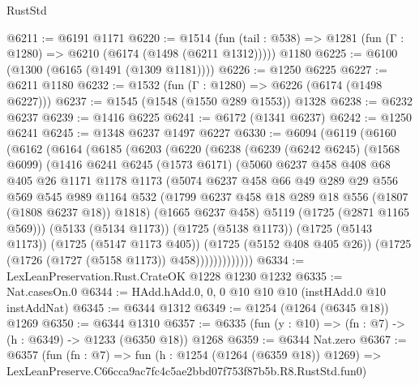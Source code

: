 \begin{lexlean}{RustStd}
\begin{coremodule}
@6211 := @6191 @1171
@6220 := @1514
    (fun (tail : @538) => @1281 (fun (Γ : @1280) => @6210 (@6174 (@1498 (@6211 @1312)))))
    @1180
@6225 := @6100 (@1300 (@6165 (@1491 (@1309 @1181))))
@6226 := @1250 @6225
@6227 := @6211 @1180
@6232 := @1532 (fun (Γ : @1280) => @6226 (@6174 (@1498 @6227)))
@6237 := @1545 (@1548 (@1550 @289 @1553)) @1328
@6238 := @6232 @6237
@6239 := @1416 @6225
@6241 := @6172 (@1341 @6237)
@6242 := @1250 @6241
@6245 := @1348 @6237 @1497 @6227
@6330 := @6094
    (@6119
      (@6160
        (@6162
          (@6164
            (@6185
              (@6203
                (@6220
                  (@6238
                    (@6239
                      (@6242 @6245)
                      (@1568 @6099)
                      (@1416
                        @6241
                        @6245
                        (@1573 @6171)
                        (@5060
                          @6237
                          @458
                          @408
                          @68
                          @405
                          @26
                          @1171
                          @1178
                          @1173
                          (@5074
                            @6237
                            @458
                            @66
                            @49
                            @289
                            @29
                            @556
                            @569
                            @545
                            @989
                            @1164
                            @532
                            (@1799 @6237 @458 @18 @289 @18 @556 (@1807 (@1808 @6237 @18)) @1818)
                            (@1665 @6237 @458)
                            @5119
                            (@1725 (@2871 @1165 @569)))
                          (@5133 (@5134 @1173))
                          (@1725 (@5138 @1173))
                          (@1725 (@5143 @1173))
                          (@1725 (@5147 @1173 @405))
                          (@1725 (@5152 @408 @405 @26))
                          (@1725 (@1726 (@1727 (@5158 @1173)) @458)))))))))))))
@6334 := LexLeanPreservation.Rust.CrateOK @1228 @1230 @1232
@6335 := Nat.casesOn.{0}
@6344 := HAdd.hAdd.{0, 0, 0} @10 @10 @10 (instHAdd.{0} @10 instAddNat)
@6345 := @6344 @1312
@6349 := @1254 (@1264 (@6345 @18)) @1269
@6350 := @6344 @1310
@6357 := @6335 (fun (y : @10) => (fn : @7) -> (h : @6349) -> @1233 (@6350 @18)) @1268
@6359 := @6344 Nat.zero
@6367 := @6357
    (fun (fn : @7) =>
    fun (h : @1254 (@1264 (@6359 @18)) @1269) =>
    LexLeanPreserve.C66cca9ac7fc4c5ae2bbd07f753f87b5b.R8.RustStd.fun0)

\end{coremodule}
\end{lexlean}
